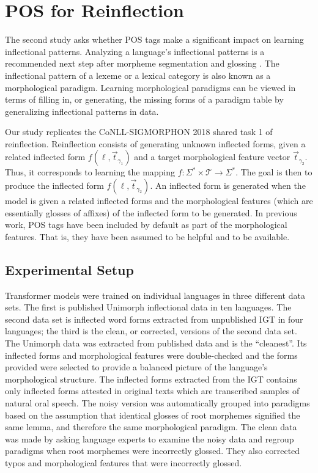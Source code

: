 \section{POS for Reinflection}
\label{sec:inflection}

The second study asks whether POS tags make a significant impact on learning inflectional patterns. Analyzing a language's inflectional patterns is a recommended next step after morpheme segmentation and glossing \citep{bird_machine_2012}. The inflectional pattern of a lexeme or a lexical category is also known as a morphological paradigm. Learning morphological paradigms can be viewed in terms of filling in, or generating, the missing forms of a paradigm table by generalizing inflectional patterns in data. 

Our study replicates the CoNLL-SIGMORPHON 2018 shared task 1 of reinflection. Reinflection consists of generating unknown inflected forms, given a related inflected form 
$f(\ell, \vec{t}_{\gamma_1})$ and a target morphological feature vector $\vec{t}_{\gamma_2}$. Thus, it corresponds to learning the mapping $f : \Sigma^* \times \mathcal{T} \to \Sigma^*$. The goal is then to produce the inflected form $f(\ell, \vec{t}_{\gamma_2})$. 
An inflected form is generated when the model is given a related inflected forms and the morphological features (which are essentially glosses of affixes) of the inflected form to be generated. 
In previous work, POS tags have been included by default as part of the morphological features. That is, they have been assumed to be helpful and to be available.


\subsection{Experimental Setup}
\label{sec:inflectionsetup}

Transformer models were trained on individual languages in three different data sets. The first is published Unimorph inflectional data in ten languages. The second data set is inflected word forms extracted from unpublished IGT in four languages; the third is the clean, or corrected, versions of the second data set. 
The Unimorph data was extracted from published data and is the ``cleanest''. Its inflected forms and morphological features were double-checked and the forms provided were selected to provide a balanced picture of the language's morphological structure. The inflected forms extracted from the IGT contains only inflected forms attested in original texts which are transcribed samples of natural oral speech. The noisy version was automatically grouped into paradigms based on the assumption that identical glosses of root morphemes signified the same lemma, and therefore the same morphological paradigm. The clean data was made by asking language experts to examine the noisy data and regroup paradigms when root morphemes were incorrectly glossed. They also corrected typos and morphological features that were incorrectly glossed. 

